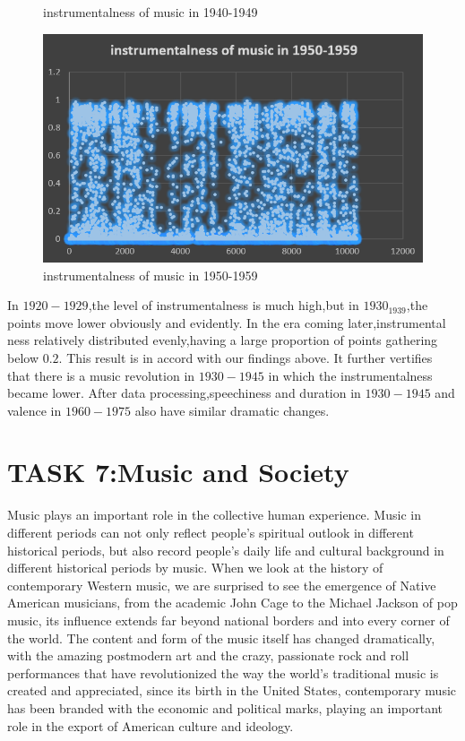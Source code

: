 \documentclass[conference]{IEEEtran}
\begin{document}
\begin{figure}[htbp]
\begin{minipage}[t]{0.5\textwidth}
		\caption{instrumentalness of music in 1940-1949\label{fig:instrumentalness3}}
	\end{minipage}
	\begin{minipage}[t]{0.5\textwidth}
		\centering
		\includegraphics[scale=0.5]{./img/instrumentalness_of_music_in_1950_1959}
		\caption{instrumentalness of music in 1950-1959\label{fig:instrumentalness4}}
	\end{minipage}
\end{figure}

In $1920-1929$,the level of instrumentalness is much high,but in $1930_1939$,the points move lower obviously and evidently. In the era coming later,instrumental ness relatively distributed evenly,having a large proportion of points gathering below $0.2$. This result is in accord with our findings above. It further vertifies that there is a music revolution in $1930-1945$ in which the instrumentalness became lower. After data processing,speechiness and duration in $1930-1945$ and valence in $1960-1975$ also have similar dramatic changes.
\section{TASK 7:Music and Society }

Music plays an important role in the collective human experience. Music in different periods can not only reflect people’s spiritual outlook in different historical periods, but also record people’s daily life and cultural background in different historical periods by music. When we look at the history of contemporary Western music, we are surprised to see the emergence of Native American musicians, from the academic John Cage to the Michael Jackson of pop music, its influence extends far beyond national borders and into every corner of the world. The content and form of the music itself has changed dramatically, with the amazing postmodern art and the crazy, passionate rock and roll performances that have revolutionized the way the world’s traditional music is created and appreciated, since its birth in the United States, contemporary music has been branded with the economic and political marks, playing an important role in the export of American culture and ideology.
\end{document}

